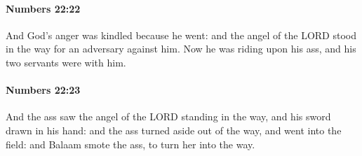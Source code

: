 		\paragraph{Numbers 22:22} %
			\label{NUMBERS-22-22}

			And God’s anger was kindled because he went: and the angel of the LORD stood in the way for an adversary against him. Now he was riding upon his ass, and his two servants were with him.


		\paragraph{Numbers 22:23} %
			\label{NUMBERS-22-23}

			And the ass saw the angel of the LORD standing in the way, and his sword drawn in his hand: and the ass turned aside out of the way, and went into the field: and Balaam smote the ass, to turn her into the way.

